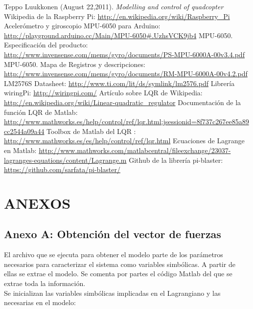 \documentclass[twoside,11pt]{book}
\begin{document}
\begin{thebibliography}{99}
 Teppo Luukkonen (August 22,2011). \textit{Modelling and control of quadcopter}
 Wikipedia de la Raspberry Pi: \url{http://en.wikipedia.org/wiki/Raspberry_Pi}
 Acelerómetro y giroscopio MPU-6050 para Arduino: \url{http://playground.arduino.cc/Main/MPU-6050#.UzhsVCK9jb4}
 MPU-6050. Especificación del producto: \url{http://www.invensense.com/mems/gyro/documents/PS-MPU-6000A-00v3.4.pdf}
 MPU-6050. Mapa de Registros y descripciones: \url{http://www.invensense.com/mems/gyro/documents/RM-MPU-6000A-00v4.2.pdf}
 LM2576S Datasheet: \url{http://www.ti.com/lit/ds/symlink/lm2576.pdf}
 Librería wiringPi: \url{http://wiringpi.com/}
 Artículo sobre LQR de Wikipedia: \url{http://en.wikipedia.org/wiki/Linear-quadratic_regulator}
 Documentación de la función LQR de Matlab: \url{http://www.mathworks.es/help/control/ref/lqr.html;jsessionid=8f737c267ee85a89cc2544a09a44}
 Toolbox de Matlab del LQR : \url{http://www.mathworks.es/es/help/control/ref/lqr.html}
 Ecuaciones de Lagrange en Matlab: \url{http://www.mathworks.com/matlabcentral/fileexchange/23037-lagranges-equations/content/Lagrange.m}
 Github de la librería pi-blaster: \url{https://github.com/sarfata/pi-blaster/}
\end{thebibliography}{}

\newpage

\chapter*{ANEXOS}
\section*{Anexo A: Obtención del vector de fuerzas}

El archivo que se ejecuta para obtener el modelo parte de los parámetros necesarios para caracterizar el sistema como variables simbólicas. A partir de ellas se extrae el modelo. Se comenta por partes el código Matlab del que se extrae toda la información. \\

Se inicializan las variables simbólicas implicadas en el Lagrangiano y las necesarias en el modelo:
\end{document}
